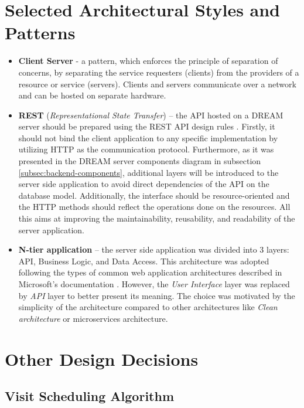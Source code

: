 \section{Selected Architectural Styles and Patterns}\label{sec:patterns}
\begin{itemize}
    \item \textbf{Client Server} - a pattern, which enforces the principle of separation of concerns, by separating the service requesters (clients) from the providers of a resource or service (servers). Clients and servers communicate over a network and can be hosted on separate hardware.
    \item \textbf{REST} (\textit{Representational State Transfer}) – the API hosted on a DREAM server should be prepared using the REST API design rules \cite{rest} \cite{rest-microsoft}. Firstly, it should not bind the client application to any specific implementation by utilizing HTTP as the communication protocol. Furthermore, as it was presented in the DREAM server components diagram in subsection \ref{subsec:backend-components}, additional layers will be introduced to the server side application to avoid direct dependencies of the API on the database model. Additionally, the interface should be resource-oriented and the HTTP methods \cite{rfc1945} should reflect the operations done on the resources. All this aims at improving the maintainability, reusability, and readability of the server application.
    \item \textbf{N-tier application} – the server side application was divided into 3 layers: API, Business Logic, and Data Access. This architecture was adopted following the types of common web application architectures described in Microsoft's documentation \cite{ntier}. However, the \textit{User Interface} layer was replaced by \textit{API} layer to better present its meaning. The choice was motivated by the simplicity of the architecture compared to other architectures like \textit{Clean architecture} or microservices architecture. 
\end{itemize}

\section{Other Design Decisions}

\subsection{Visit Scheduling Algorithm}\label{subsec:visits-alg}

